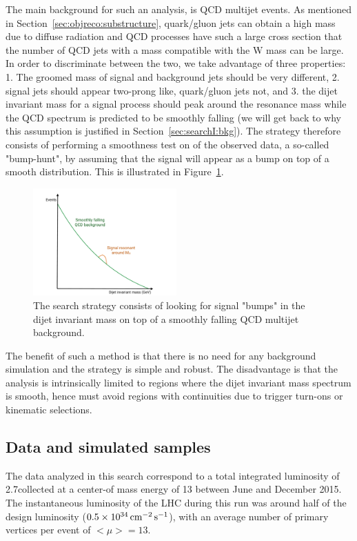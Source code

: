 The main background for such an analysis, is QCD multijet events. As mentioned in Section~\ref{sec:objreco:substructure}, quark/gluon jets can obtain a high mass due to diffuse radiation and QCD processes have such a large cross section that the number of QCD jets with a mass compatible with the W mass can be large. In order to discriminate between the two, we take advantage of three properties: 1. The groomed mass of signal and background jets should be very different, 2. signal jets should appear two-prong like, quark/gluon jets not, and 3. the dijet invariant mass for a signal process should peak around the resonance mass while the QCD spectrum is predicted to be smoothly falling (we will get back to why this assumption is justified in Section~\ref{sec:searchI:bkg}). The strategy therefore consists of performing a smoothness test on \mjj of the observed data, a so-called "bump-hunt", by assuming that the signal will appear as a bump on top of a smooth distribution. This is illustrated in Figure~\ref{fig:searchI:bumphunt}.

\begin{figure}[ht] 
    \centering
    \includegraphics[width=0.49\textwidth]{figures/analysis/search1/misc/sigExtraction.pdf}
    \caption{The search strategy consists of looking for signal "bumps" in the dijet invariant mass on top of a smoothly falling QCD multijet background.}
    \label{fig:searchI:bumphunt}
\end{figure}

The benefit of such a method is that there is no need for any background simulation and the strategy is simple and robust. The disadvantage is that the analysis is intrinsically limited to regions where the dijet invariant mass spectrum is smooth, hence must avoid regions with continuities due to trigger turn-ons or kinematic selections.

\subsection{Data and simulated samples}
\label{sec:searchI:samples}
The data analyzed in this search correspond to a total integrated luminosity of 2.7\fbinv collected at a center-of mass energy of 13 \TeV between June and December 2015. The instantaneous luminosity of the LHC during this run was around half of the design luminosity ($0.5 \times 10^{34} \,\text{cm}^\text{$-$2}\,\text{s}^\text{$-$1}$), with an average number of primary vertices per event of $<\mu>=13$. \par\par

